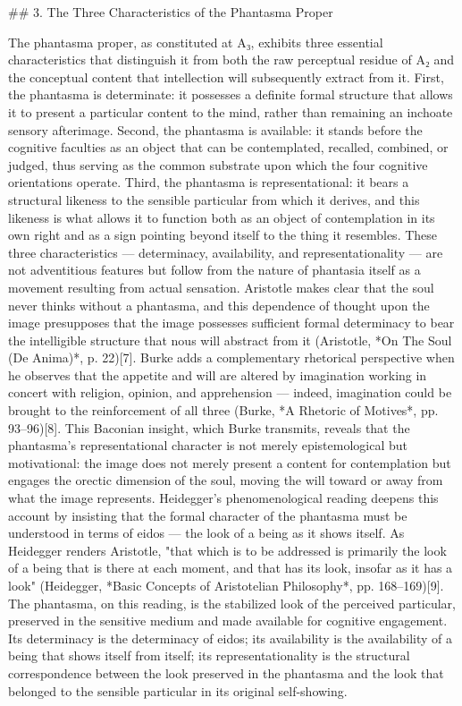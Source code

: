 ## 3. The Three Characteristics of the Phantasma Proper

The phantasma proper, as constituted at A₃, exhibits three essential characteristics that distinguish it from both the raw perceptual residue of A₂ and the conceptual content that intellection will subsequently extract from it. First, the phantasma is determinate: it possesses a definite formal structure that allows it to present a particular content to the mind, rather than remaining an inchoate sensory afterimage. Second, the phantasma is available: it stands before the cognitive faculties as an object that can be contemplated, recalled, combined, or judged, thus serving as the common substrate upon which the four cognitive orientations operate. Third, the phantasma is representational: it bears a structural likeness to the sensible particular from which it derives, and this likeness is what allows it to function both as an object of contemplation in its own right and as a sign pointing beyond itself to the thing it resembles. These three characteristics — determinacy, availability, and representationality — are not adventitious features but follow from the nature of phantasia itself as a movement resulting from actual sensation. Aristotle makes clear that the soul never thinks without a phantasma, and this dependence of thought upon the image presupposes that the image possesses sufficient formal determinacy to bear the intelligible structure that nous will abstract from it (Aristotle, *On The Soul (De Anima)*, p. 22)[7]. Burke adds a complementary rhetorical perspective when he observes that the appetite and will are altered by imagination working in concert with religion, opinion, and apprehension — indeed, imagination could be brought to the reinforcement of all three (Burke, *A Rhetoric of Motives*, pp. 93–96)[8]. This Baconian insight, which Burke transmits, reveals that the phantasma's representational character is not merely epistemological but motivational: the image does not merely present a content for contemplation but engages the orectic dimension of the soul, moving the will toward or away from what the image represents. Heidegger's phenomenological reading deepens this account by insisting that the formal character of the phantasma must be understood in terms of eidos — the look of a being as it shows itself. As Heidegger renders Aristotle, "that which is to be addressed is primarily the look of a being that is there at each moment, and that has its look, insofar as it has a look" (Heidegger, *Basic Concepts of Aristotelian Philosophy*, pp. 168–169)[9]. The phantasma, on this reading, is the stabilized look of the perceived particular, preserved in the sensitive medium and made available for cognitive engagement. Its determinacy is the determinacy of eidos; its availability is the availability of a being that shows itself from itself; its representationality is the structural correspondence between the look preserved in the phantasma and the look that belonged to the sensible particular in its original self-showing. 

